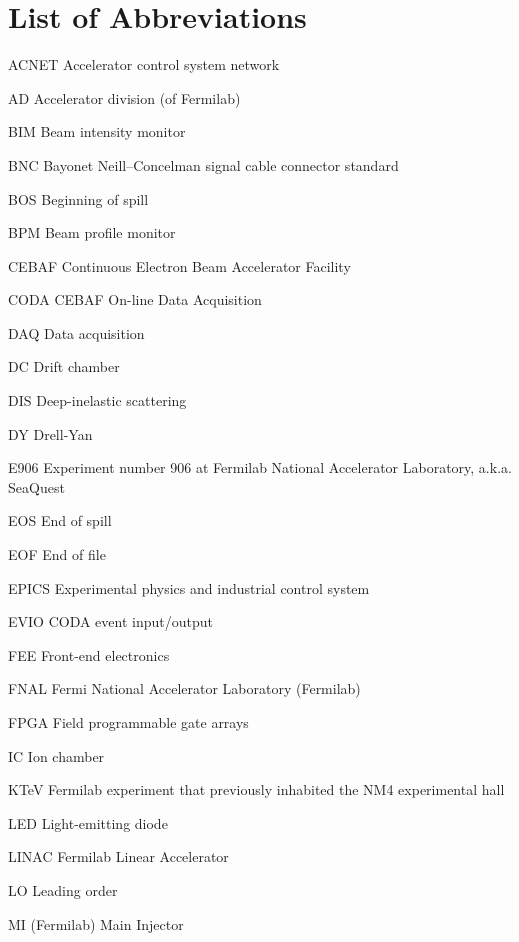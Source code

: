 \documentclass[edeposit,fullpage]{uiucthesis2009}
\begin{document}
\tableofcontents
\listoftables
\listoffigures

\chapter{List of Abbreviations}

\begin{symbollist*}
	\item[ACNET] Accelerator control system network
	\item[AD] Accelerator division (of Fermilab)
	\item[BIM] Beam intensity monitor
	\item[BNC] Bayonet Neill–Concelman signal cable connector standard
	\item[BOS] Beginning of spill
	\item[BPM] Beam profile monitor
	\item[CEBAF] Continuous Electron Beam Accelerator Facility
	\item[CODA] CEBAF On-line Data Acquisition
	\item[DAQ] Data acquisition
	\item[DC] Drift chamber
	\item[DIS] Deep-inelastic scattering
	\item[DY] Drell-Yan
	\item[E906] Experiment number 906 at Fermilab National Accelerator Laboratory, a.k.a. SeaQuest
	\item[EOS] End of spill
	\item[EOF] End of file
	\item[EPICS] Experimental physics and industrial control system
	\item[EVIO] CODA event input/output
	\item[FEE] Front-end electronics
	\item[FNAL] Fermi National Accelerator Laboratory (Fermilab)
	\item[FPGA] Field programmable gate arrays
	\item[IC] Ion chamber
	\item[KTeV] Fermilab experiment that previously inhabited the NM4 experimental hall
	\item[LED] Light-emitting diode
	\item[LINAC] Fermilab Linear Accelerator
	\item[LO] Leading order
	\item[MI] (Fermilab) Main Injector

\end{symbollist*}
\end{document}
